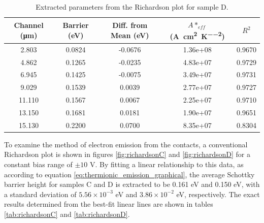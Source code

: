 \begin{table}[h]
    \centering
    \begin{tabular}{|c|c|c|c|c|}
        \hline
        Channel (\si{\micro\metre}) & Barrier (\si{\electronvolt}) & Diff. from Mean (\si{\electronvolt}) & $A*_{eff}$ (\si{\ampere\per\centi\metre\squared\per\kelvin\squared}) & $R^{2}$\\ \hline
        2.803 & 0.0824 & -0.0676 & 1.36e+08 &0.9670 \\ 
        4.862 & 0.1265 & -0.0235 & 4.83e+07 &0.9729 \\  
        6.945 & 0.1425 & -0.0075 & 3.49e+07 &0.9731 \\ 
        9.029 & 0.1539 & 0.0039 & 2.77e+07 &0.9727 \\ 
        11.110 & 0.1567 & 0.0067 & 2.25e+07 &0.9710 \\ 
        13.150 & 0.1681 & 0.0181 & 1.90e+07 &0.9651 \\ 
        15.130 & 0.2200 & 0.0700 & 8.35e+07 &0.8304 \\ 
        \hline
    \end{tabular}
    \caption{Extracted parameters from the Richardson plot for sample D.}
    \label{tab:richardsonD_50V}
\end{table}

To examine the method of electron emission from the contacts, a conventional Richardson plot is shown in figures \ref{fig:richardsonC} and \ref{fig:richardsonD} for a constant bias range of $\pm10$ \si{\volt}. By fitting a linear relationship to this data, as according to equation \ref{eq:thermionic_emission_graphical}, the average Schottky barrier height for samples C and D is extracted to be 0.161 \si{\electronvolt} and 0.150 \si{\electronvolt}, with a standard deviation of $5.56\times10^{-3}$ \si{\electronvolt} and $3.86\times10^{-2}$ \si{\electronvolt}, respectively. The exact results determined from the best-fit linear lines are shown in tables \ref{tab:richardsonC} and \ref{tab:richardsonD}.

